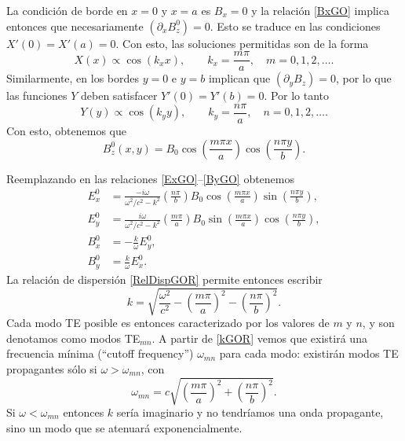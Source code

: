La condición de borde en $x=0$ y $x=a$ es $B_x=0$ y la relación \eqref{BxGO} implica entonces que necesariamente $(\partial_xB^0_z)=0$. Esto se traduce en las condiciones $X'(0)=X'(a)=0$. Con esto, las soluciones permitidas son de la forma
\begin{equation}
X(x) \propto \cos(k_x x), \qquad k_x = \frac{m\pi}{a}, \quad m=0,1,2,\dots.
\end{equation}
Similarmente, en los bordes $y=0$ e $y=b$ implican que $(\partial_yB_z)=0$, por lo que las funciones $Y$ deben satisfacer $Y'(0)=Y'(b)=0$. Por lo tanto
\begin{equation}
Y(y) \propto \cos(k_y y), \qquad k_y = \frac{n\pi}{a}, \quad n=0,1,2,\dots.
\end{equation}
Con esto, obtenemos que
\begin{equation}
B^0_z(x, y) = B_0 \cos\left(\frac{m \pi x}{a}\right) \cos\left(\frac{n \pi y}{b}\right).
\end{equation}

Reemplazando en las relaciones \eqref{ExGO}--\eqref{ByGO} obtenemos
\begin{align}
    E^0_x &= \frac{-i\omega}{\omega^2/c^2 - k^2}\left(\frac{n \pi}{b}\right)  B_0\cos\left(\frac{m \pi x}{a}\right) \sin\left(\frac{n \pi y}{b}\right), \label{ExGOTE}\\
    E^0_y &= \frac{i\omega}{\omega^2/c^2 - k^2}\left(\frac{m \pi}{a}\right)  B_0\sin\left(\frac{m \pi x}{a}\right) \cos\left(\frac{n \pi y}{b}\right), \label{EyGOTE}\\
    B^0_x &= -\frac{k}{\omega}E^0_y, \label{BxGOTE}\\
    B^0_y &= \frac{k}{\omega}E^0_x. \label{ByGOTE}
\end{align}
La relación de dispersión \eqref{RelDispGOR} permite entonces escribir
\begin{equation}\label{kGOR}
k = \sqrt{\frac{\omega^2}{c^2} - \left(\frac{m \pi}{a}\right)^2 - \left(\frac{n \pi}{b}\right)^2}.
\end{equation}
Cada modo TE posible es entonces caracterizado por los valores de $m$ y $n$, y son denotamos como modos TE$_{mn}$. A partir de \eqref{kGOR} vemos que existirá una frecuencia mínima (``cutoff frequency'') $\omega_{mn}$ para cada modo: existirán modos TE propagantes sólo si $\omega>\omega_{mn}$, con
\begin{equation}
\omega_{mn} = c \sqrt{\left(\frac{m \pi}{a}\right)^2 + \left(\frac{n \pi}{b}\right)^2}.
\end{equation}
Si $\omega<\omega_{mn}$ entonces $k$ sería imaginario y no tendríamos una onda propagante, sino un modo que se atenuará exponencialmente.

